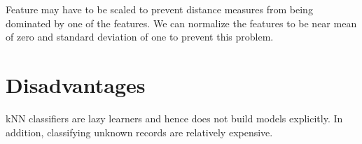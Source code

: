 \begin{multicols}{2}
\noindent Feature may have to be scaled to prevent distance measures from being dominated by one of the features. We can normalize the features to be near mean of zero and standard deviation of one to prevent this problem. 

\section{Disadvantages}

kNN classifiers are lazy learners and hence does not build models explicitly. In addition, classifying unknown records are relatively expensive. 


\end{multicols}
